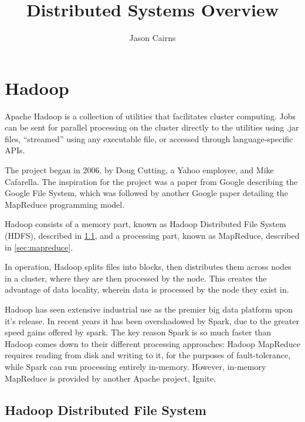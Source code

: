 \documentclass[10pt,a4paper]{article}
\begin{document}
\title{Distributed Systems Overview}
\author{Jason Cairns}
\maketitle{}

\tableofcontents{}

\section{Hadoop}
\label{sec:hadoop-1}
\nocite{dean2004mapreduce}
\nocite{ghemawat2003google}
\nocite{shvachko2010hadoop}
\nocite{zheludkov2017high}
\nocite{akidau2013millwheel}
Apache Hadoop is a collection of utilities that facilitates cluster
computing. Jobs can be sent for parallel processing on the cluster
directly to the utilities using .jar files, ``streamed'' using any
executable file, or accessed through language-specific APIs.

The project began in 2006, by Doug Cutting, a Yahoo employee, and Mike
Cafarella. The inspiration for the project was a paper from Google
describing the Google File System, which was followed by another
Google paper detailing the MapReduce programming model.

Hadoop consists of a memory part, known as Hadoop Distributed File
System (HDFS), described in \ref{sec:hdfs}, and a processing part,
known as MapReduce, described in \ref{sec:mapreduce}.

In operation, Hadoop splits files into blocks, then distributes them
across nodes in a cluster, where they are then processed by the node.
This creates the advantage of data locality, wherein data is processed
by the node they exist in.

Hadoop has seen extensive industrial use as the premier big data
platform upon it's release. In recent years it has been overshadowed
by Spark, due to the greater speed gains offered by spark. The key
reason Spark is so much faster than Hadoop comes down to their
different processing approaches: Hadoop MapReduce requires reading
from disk and writing to it, for the purposes of fault-tolerance,
while Spark can run processing entirely in-memory. However, in-memory
MapReduce is provided by another Apache project, Ignite.

\subsection{Hadoop Distributed File System}
\label{sec:hdfs}
\end{document}
